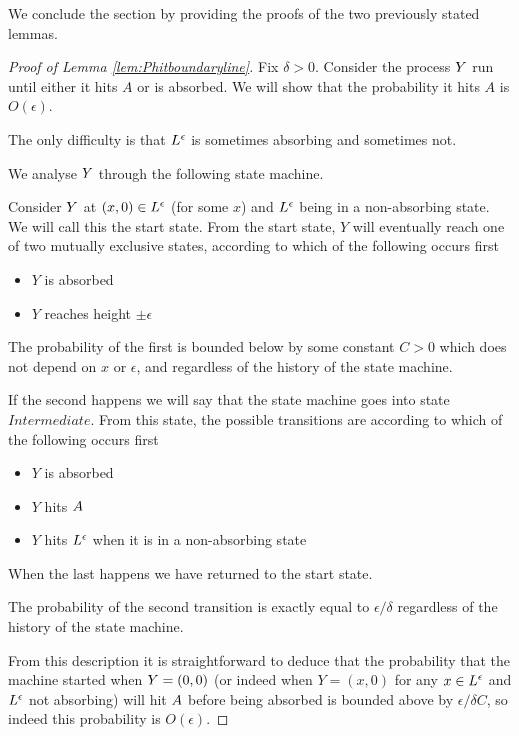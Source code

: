 {We conclude the section by providing the proofs of the two previously
stated lemmas.

\begin{proof}[Proof of Lemma \ref{lem:Phitboundaryline}]
Fix $\delta > 0$.  Consider the process $Y$ run until either
it hits $A$ or is absorbed.  We will show that the probability it
hits $A$ is $O(\epsilon)$.

The only difficulty is that $L^\epsilon$ is sometimes absorbing and
sometimes not.

We analyse $Y$ through the following state machine.

Consider $Y$ at $(x,0) \in L^\epsilon$ (for some $x$) and $L^\epsilon$ being in
a non-absorbing state.  We will call this the start state.  From the
start state, $Y$ will eventually reach one of two mutually exclusive
states, according to which of the following occurs first

\newcommand{\intermediatelines}{I}

\begin{itemize}
\item $Y$ is absorbed
\item $Y$ reaches height $\pm\epsilon$
\end{itemize}

The probability of the first is bounded below by some constant $C > 0$
which does not depend on $x$ or $\epsilon$, and regardless of the
history of the state machine.

\newcommand{\stateintermediate}{Intermediate}

If the second happens we will say that the state machine goes into
state $\stateintermediate$.  From this state, the possible transitions
are according to which of the following occurs first

\begin{itemize}
\item $Y$ is absorbed
\item $Y$ hits $A$
\item $Y$ hits $L^\epsilon$ when it is in a non-absorbing state
\end{itemize}

When the last happens we have returned to the start state.

The probability of the second transition is exactly equal to
$\epsilon/\delta$ regardless of the history of the state machine.

From this description it is straightforward to deduce that the
probability that the machine started when $Y = (0,0)$ (or indeed when
$Y = (x, 0)$ for any $x \in L^\epsilon$ and $L^\epsilon$ not absorbing) will hit
$A$ before being absorbed is
bounded above by $\epsilon/\delta C$, so indeed this probability is
$O(\epsilon)$.
\end{proof}

}
